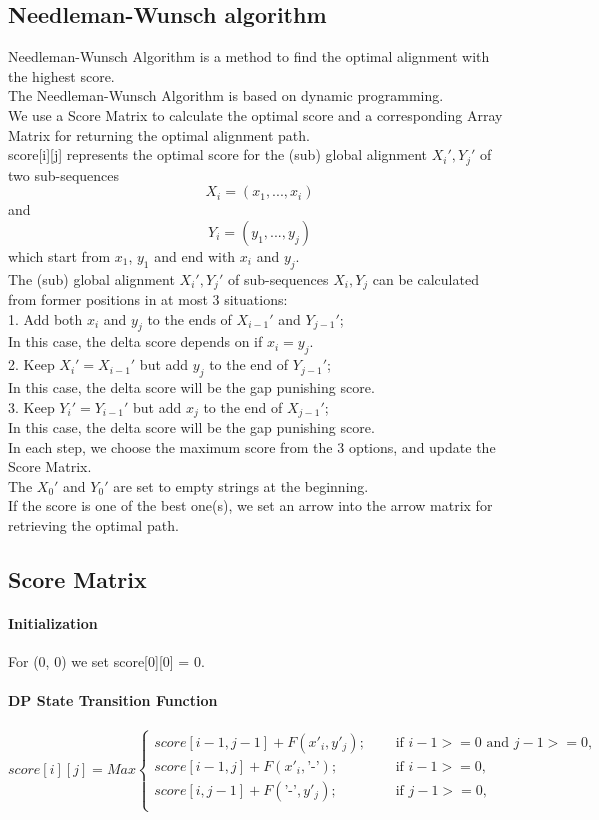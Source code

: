 \documentclass[a4paper, 12pt, one column]{article}
\begin{document}
\subsection{Needleman-Wunsch algorithm}
Needleman-Wunsch Algorithm is a method to find the optimal alignment with
the highest score. \\
The Needleman-Wunsch Algorithm is based on dynamic programming.\\
We use a Score Matrix to calculate the optimal score and a corresponding Array Matrix for returning the optimal alignment path. \\
score[i][j] represents the optimal score for the (sub) global alignment $X_i',Y_j'$ of two sub-sequences
\[
    X_i = (x_1, ..., x_i)
\]
and
\[
    Y_i = (y_1, ..., y_j)
\]
which start from $x_1$, $y_1$ and end with $x_i$ and $y_j$. \\
The (sub) global alignment $X_i',Y_j'$ of sub-sequences $X_i, Y_j$ can be calculated from former positions in at most 3 situations: \\
1. Add both $x_i$ and $y_j$ to the ends of $X_{i-1}'$ and $Y_{j-1}'$; \\
\indent In this case, the delta score depends on if $x_i = y_j$.\\
2. Keep $X_i' = X_{i-1}'$ but add $y_j$ to the end of $Y_{j-1}'$; \\
\indent In this case, the delta score will be the gap punishing score.\\
3. Keep $Y_i' = Y_{i-1}'$ but add $x_j$ to the end of $X_{j-1}'$; \\
\indent In this case, the delta score will be the gap punishing score.\\
In each step, we choose the maximum score from the 3 options, and update the Score Matrix. \\
The $X_0'$ and $Y_0'$ are set to empty strings at the beginning.\\
If the score is one of the best one(s), we set an arrow into the arrow matrix for retrieving the optimal path.
\subsection{Score Matrix}
\paragraph{Initialization} 
For (0, 0) we set score[0][0] = 0.
\paragraph{DP State Transition Function}
\[
    score[i][j] = Max 
    \begin{cases}
        score[i-1, j-1] + F(x'_i, y'_j); \quad & \text{ if } i-1>=0 \text{ and } j-1>=0, \\
        score[i-1, j] + F(x'_i, \text{'-'}); \quad & \text{ if } i-1>=0, \\
        score[i, j-1] + F(\text{'-'}, y'_j); \quad & \text{ if } j-1>=0,  \\
    \end{cases}
\]
\end{document}
